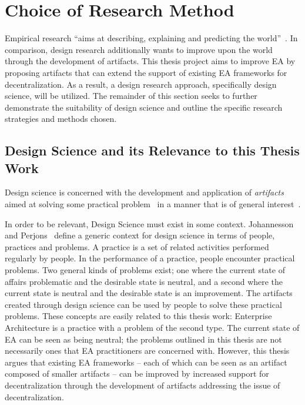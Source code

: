 \section{Choice of Research Method}

Empirical research ``aims at describing, explaining and predicting the world''~\cite[Ch. 1]{johannessonPerjons2012}. In comparison, design research additionally wants to improve upon the world through the development of artifacts. This thesis project aims to improve EA by proposing artifacts that can extend the support of existing EA frameworks for decentralization. As a result, a design research approach, specifically design science, will be utilized. The remainder of this section seeks to further demonstrate the suitability of design science and outline the specific research strategies and methods chosen. 

\subsection{Design Science and its Relevance to this Thesis Work}

Design science is concerned with the development and application of \textit{artifacts} aimed at solving some practical problem~\cite{hevner2004,johannessonPerjons2012} in a manner that is of general interest~\cite[Ch. 1]{johannessonPerjons2012}. 

In order to be relevant, Design Science must exist in some context. Johannesson and Perjons~\cite[Ch. 1]{johannessonPerjons2012} define a generic context for design science in terms of people, practices and problems. A practice is a set of related activities performed regularly by people. In the performance of a practice, people encounter practical problems. Two general kinds of problems exist; one where the current state of affairs problematic and the desirable state is neutral, and a second where the current state is neutral and the desirable state is an improvement. The artifacts created through design science can be used by people to solve these practical problems. These concepts are easily related to this thesis work: Enterprise Architecture is a practice with a problem of the second type.  The current state of EA can be seen as being neutral; the problems outlined in this thesis are not necessarily ones that EA practitioners are concerned with.  However, this thesis argues that existing EA frameworks -- each of which can be seen as an artifact composed of smaller artifacts -- can be improved by increased support for decentralization through the development of artifacts addressing the issue of decentralization. 

